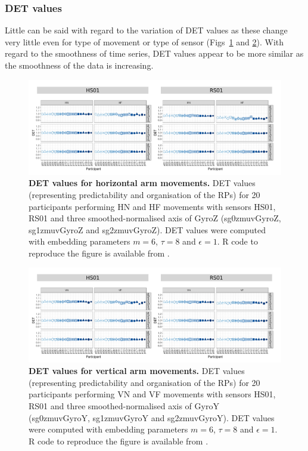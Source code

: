 






\subsubsection*{DET values}
Little can be said with regard to the variation of DET values
as these change very little even for type of movement or type of sensor
(Figs~\ref{fig:det_aH} and \ref{fig:det_aV}).
With regard to the smoothness of time series, DET values appear to be more similar 
as the smoothness of the data is increasing.
\begin{figure}[!h]
\centering
\includegraphics[width=1.0\textwidth]{det_aH}
    \caption{
	{\bf DET values for horizontal arm movements.}	
    	DET values (representing predictability and organisation of the RPs) for 
	20 participants performing HN and HF movements
	with sensors HS01, RS01 and three smoothed-normalised axis 
	of GyroZ (sg0zmuvGyroZ, sg1zmuvGyroZ and sg2zmuvGyroZ).
	DET values were computed with 
	embedding parameters $m=6$, $\tau=8$ and $\epsilon=1$.
	R code to reproduce the figure is available from \cite{hwum2018}.
        }
    \label{fig:det_aH}
\end{figure}
\begin{figure}[!h]
\centering
\includegraphics[width=1.0\textwidth]{det_aV}
    \caption{
	{\bf DET values for vertical arm movements.}	
    	DET values (representing predictability and organisation of the RPs) for 
	20 participants performing VN and VF movements
	with sensors HS01, RS01 and three smoothed-normalised axis 
	of GyroY (sg0zmuvGyroY, sg1zmuvGyroY and sg2zmuvGyroY).
	DET values were computed with 
	embedding parameters $m=6$, $\tau=8$ and $\epsilon=1$.
	R code to reproduce the figure is available from \cite{hwum2018}.
        }
    \label{fig:det_aV}
\end{figure}
